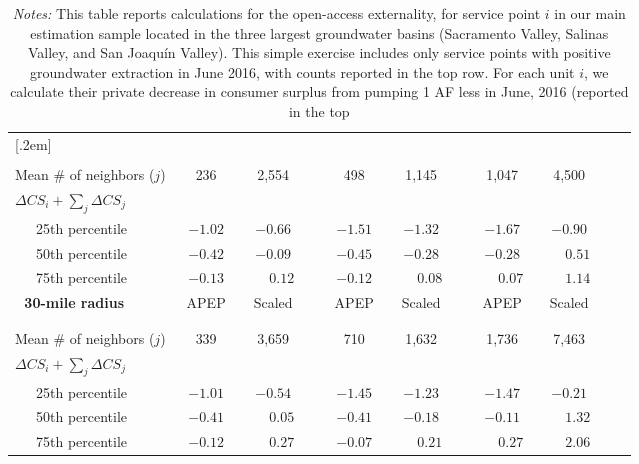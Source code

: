 \begin{table}
\begin{adjustbox}{center}
\begin{tabular}{lcccccccccc}
[.2em]
\hline
\\
\vspace{-9mm}
\\
Mean \# of neighbors ($j$) & 236 & 2,554 && 498 & 1,145 && 1,047 & 4,500 \\
[.5em]
$\Delta CS_i + \sum_j \Delta CS_j$    \\ 
[.15em]
~~~25th percentile  & $-1.02$ & $-0.66$ && $-1.51$ & $-1.32$ && $-1.67$ & $-0.90$ \\  
[.05em]
~~~50th percentile  & $-0.42$ & $-0.09$ && $-0.45$ & $-0.28$ && $-0.28$ & $\mathbf{\phantom{-}0.51}$ \\  
[.05em]
~~~75th percentile  & $-0.13$ & $\mathbf{\phantom{-}0.12}$ && $-0.12$ & $\mathbf{\phantom{-}0.08}$ && $\mathbf{\phantom{-}0.07}$ & $\mathbf{\phantom{-}1.14}$ \\  
[1.5em]
\multicolumn{1}{c}{\bf 30-mile radius~~~~}  & ~APEP~ & ~Scaled~ & &  ~APEP~ & ~Scaled~ & & ~APEP~ & ~Scaled~ \\ 
[.2em]
\hline
\\
\vspace{-9mm}
\\
Mean \# of neighbors ($j$) & 339 & 3,659 && 710 & 1,632 && 1,736 & 7,463 \\
[.5em]
$\Delta CS_i + \sum_j \Delta CS_j$    \\ 
[.15em]
~~~25th percentile  & $-1.01$ & $-0.54$ && $-1.45$ & $-1.23$ && $-1.47$ & $-0.21$ \\  
[.05em]
~~~50th percentile  & $-0.41$ & $\mathbf{\phantom{-}0.05}$ && $-0.41$ & $-0.18$ && $-0.11$ & $\mathbf{\phantom{-}1.32}$ \\  
[.05em]
~~~75th percentile  & $-0.12$ & $\mathbf{\phantom{-}0.27}$ && $-0.07$ & $\mathbf{\phantom{-}0.21}$ && $\mathbf{\phantom{-}0.27}$ & $\mathbf{\phantom{-}2.06}$ \\  
[0.2em]
\hline
\end{tabular}
\end{adjustbox}
\captionsetup{width=\textwidth}
\caption*{\scriptsize \emph{Notes:} 
This table reports calculations for the open-access externality, for service point $i$ in our main estimation sample located  
in the three largest groundwater basins (Sacramento Valley, Salinas Valley, and San Joaqu\'{i}n Valley). This simple exercise  
includes only service points with positive groundwater extraction in June 2016, with counts reported in the top row. For each 
unit $i$, we calculate their private decrease in consumer surplus from pumping 1 AF less in June, 2016 (reported in the top  
}
\end{table}
